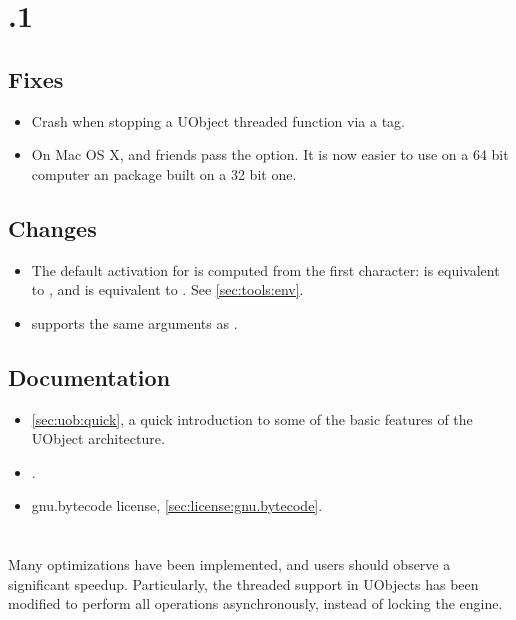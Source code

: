 \section{.1}

\subsection{Fixes}
\begin{itemize}
\item Crash when stopping a UObject threaded function via a tag.
\item On Mac OS X,  and friends pass the  option.
  It is now easier to use on a 64 bit computer an \usdk package built on a
  32 bit one.
\end{itemize}

\subsection{Changes}
\begin{itemize}
\item The default activation for  is computed from the
  first character:  is equivalent to
  , and  is equivalent to
  .  See \autoref{sec:tools:env}.
\item {} supports the same arguments as
  .
\end{itemize}

\subsection{Documentation}
\begin{itemize}
\item \autoref{sec:uob:quick}, a quick introduction to some of the basic
  features of the UObject architecture.
\item {}.
\item gnu.bytecode license, \autoref{sec:license:gnu.bytecode}.
\end{itemize}

\section{}

Many optimizations have been implemented, and users should observe a
significant speedup. Particularly, the threaded support in UObjects has been
modified to perform all operations asynchronously, instead of locking the
engine.

